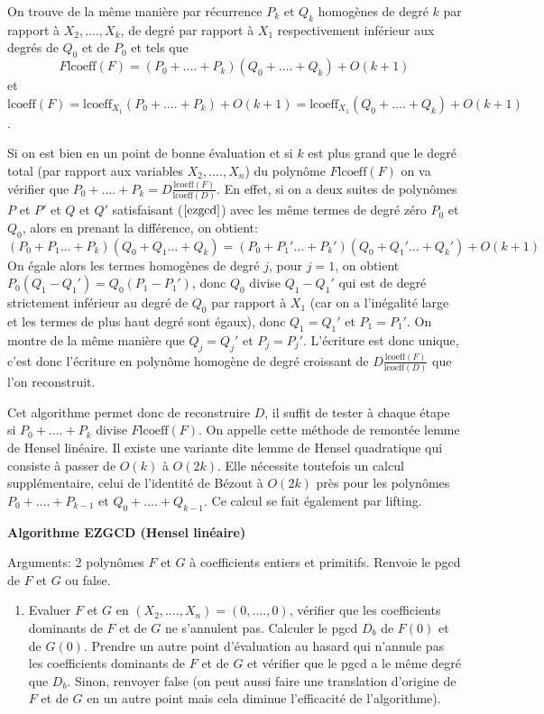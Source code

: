 \documentclass[a4paper,11pt]{book}
\begin{document}
\begin{giacjshere}
On trouve de la même manière par récurrence $P_k$ et $Q_k$ homogènes de degré
$k$ par rapport à $X_2, \ldots ., X_k$, de degré par rapport à $X_1$
respectivement inférieur aux degrés de $Q_0$ et de $P_0$ et tels que
\begin{equation}
  F \mbox{lcoeff} ( F ) = ( P_0 + \ldots . + P_k ) ( Q_0 + \ldots . + Q_k ) +
  O ( k + 1  ) \label{ezgcd}
\end{equation}
et $\mbox{lcoeff} ( F ) = \mbox{lcoeff}_{X_1} ( P_0 + \ldots . + P_k ) + O ( k
+ 1 ) = \mbox{lcoeff}_{X_1} ( Q_0 + \ldots . + Q_k ) + O ( k + 1 )$.

Si on est bien en un point de bonne évaluation et si $k$ est plus grand que le
degré total (par rapport aux variables $X_2, \ldots ., X_n$) du polynôme
 $F \mbox{lcoeff} ( F )$ on va vérifier que $P_0 + \ldots . + P_k = D
\frac{\mbox{lcoeff} ( F )}{\mbox{lcoeff} ( D )}$. En effet, si on a deux
suites de polynômes $P$ et $P'$ et $Q$ et $Q'$ satisfaisant (\(\ref{ezgcd}\)) avec
les même termes de degré zéro $P_0$ et $Q_0$, alors en prenant la différence,
on obtient:
\[ ( P_0 + P_1 \ldots  + P_k ) ( Q_0 + Q_1 \ldots  + Q_k ) = ( P_0 + P_1'
   \ldots  + P_k' ) ( Q_0 + Q_1' \ldots  + Q_k' ) + O ( k + 1 ) \]
On égale alors les termes homogènes de degré $j$, pour $j = 1$, on obtient
$P_0 ( Q_1 - Q_1' ) = Q_0 ( P_1 - P_1' )$, donc $Q_0$ divise $Q_1 - Q_1'$ qui
est de degré strictement inférieur au degré de $Q_0$ par rapport à $X_1$ (car
on a l'inégalité large et les termes de plus haut degré sont égaux),
donc $Q_1 = Q_1'$ et $P_1 = P_1'$. On montre de la même manière que $Q_j =
Q_j'$ et $P_j = P_j'$. L'écriture est donc unique, c'est donc l'écriture en
polynôme homogène de degré croissant de $D \frac{\mbox{lcoeff} ( F
)}{\mbox{lcoeff} ( D )}$ que l'on reconstruit.

Cet algorithme permet donc de reconstruire $D$, il suffit de tester à chaque
étape si $P_0 + \ldots . + P_k$ divise $F \mbox{lcoeff} ( F )$. On appelle
cette méthode de remontée lemme de Hensel linéaire. Il existe une variante
dite lemme de Hensel quadratique qui consiste à passer de $O ( k )$ à $O ( 2 k
)$. Elle nécessite toutefois un calcul supplémentaire, celui de l'identité de
Bézout à $O ( 2 k )$ près pour les polynômes $P_0 + \ldots . + P_{k - 1}$ et
$Q_0 + \ldots . + Q_{k - 1}$. Ce calcul se fait également par lifting.

{\bf{Algorithme EZGCD (Hensel linéaire)}}

Arguments: 2 polynômes $F$ et $G$ à coefficients entiers et primitifs. Renvoie
le pgcd de $F$ et $G$ ou false.
\begin{enumerate}
  \item Evaluer $F$ et $G$ en $( X_2, \ldots ., X_n ) = ( 0, \ldots ., 0 )$,
  vérifier que les coefficients dominants de $F$ et de $G$ ne s'annulent pas.
  Calculer le pgcd $D_b$ de $F ( 0 )$ et de $G ( 0 )$. Prendre un autre point
  d'évaluation au hasard qui n'annule pas les coefficients dominants de $F$ et
  de $G$ et vérifier que le pgcd a le même degré que $D_b$. Sinon, renvoyer
  false (on peut aussi faire une translation d'origine de $F$ et de $G$ en un
  autre point mais cela diminue l'efficacité de l'algorithme).
  

\end{enumerate}
\end{giacjshere}
\end{document}
